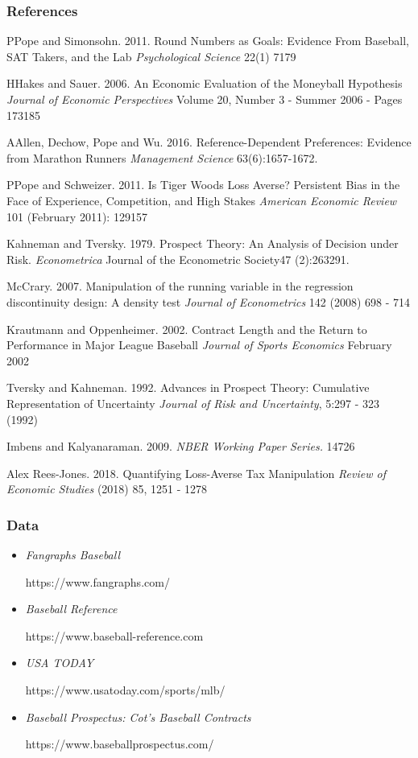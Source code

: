 \documentclass[dvipdfmx,12pt]{beamer}
\begin{document}
\begin{frame}\frametitle{References}
  \tiny
  \begin{thebibliography}{99}
    \bibitem PPope and Simonsohn. 2011.
    Round Numbers as Goals: Evidence From Baseball, SAT Takers, and the Lab
    \textit{Psychological Science} 22(1) 7179

    \bibitem HHakes and Sauer. 2006.
    An Economic Evaluation of the Moneyball Hypothesis
    \textit{Journal of Economic Perspectives} Volume 20, Number 3 - Summer 2006 - Pages 173185

    \bibitem AAllen, Dechow, Pope and Wu. 2016.
    Reference-Dependent Preferences: Evidence from Marathon Runners \textit{Management Science} 63(6):1657-1672.

    \bibitem PPope and Schweizer. 2011.
    Is Tiger Woods Loss Averse? Persistent Bias in the Face of Experience, Competition, and High Stakes
    \textit{American Economic Review} 101 (February 2011): 129157

    \bibitem{}Kahneman and Tversky. 1979.
    Prospect Theory: An Analysis of Decision under Risk.
    \textit{Econometrica}
    Journal of the Econometric Society47 (2):263291.

    \bibitem{}McCrary. 2007.
    Manipulation of the running variable in the regression discontinuity design: A density test
    \textit{Journal of Econometrics} 142 (2008) 698 - 714

    \bibitem{}Krautmann and Oppenheimer. 2002.
    Contract Length and the Return to Performance in Major League Baseball
    \textit{Journal of Sports Economics} February 2002

    \bibitem{}Tversky and Kahneman. 1992.
    Advances in Prospect Theory: Cumulative Representation of Uncertainty
    \textit{Journal of Risk and Uncertainty}, 5:297 - 323 (1992)

    \bibitem{}Imbens and Kalyanaraman. 2009.
    \textit{NBER Working Paper Series.} 14726

    \bibitem{}Alex Rees-Jones. 2018.
    Quantifying Loss-Averse Tax Manipulation
    \textit{Review of Economic Studies} (2018) 85, 1251 - 1278
  \end{thebibliography}
\end{frame}

\begin{frame}\frametitle{Data}
  \begin{itemize}
    \item \textit{Fangraphs Baseball}

    https://www.fangraphs.com/

    \item \textit{Baseball Reference}

    https://www.baseball-reference.com

    \item \textit{USA TODAY}

    https://www.usatoday.com/sports/mlb/

    \item \textit{Baseball Prospectus: Cot's Baseball Contracts}

    https://www.baseballprospectus.com/
  \end{itemize}
\end{frame}
\end{document}

